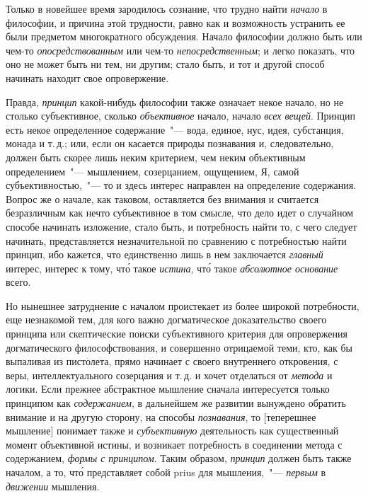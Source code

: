 Только в новейшее время зародилось сознание, что
трудно найти \emph{начало} в философии, и причина этой трудности,
равно как и возможность устранить ее были предметом
многократного обсуждения. Начало философии
должно быть или чем-то \emph{опосредствованным} или чем-то
\emph{непосредственным}; и легко показать, что оно не может
быть ни тем, ни другим; стало быть, и тот и другой способ
начинать находит свое опровержение.

Правда, \emph{принцип} какой-нибудь философии также
означает некое начало, но не столько субъективное,
сколько \emph{объективное} начало, начало \emph{всех вещей}. Принцип
есть некое определенное содержание~"--- вода, единое,
нус, идея, субстанция, монада\endnotemark{} и т.\,д.; или, если он касается
природы познавания и, следовательно, должен
быть скорее лишь неким критерием, чем неким объективным
определением~"--- мышлением, созерцанием, ощущением,
Я, самой субъективностью,~"--- то и здесь интерес
направлен на определение содержания. Вопрос же о начале,
как таковом, оставляется без внимания и считается
безразличным как нечто субъективное в том смысле, что
дело идет о случайном способе начинать изложение, стало
быть, и потребность найти то, с чего следует начинать,
представляется незначительной по сравнению с потребностью
найти принцип, ибо кажется, что единственно
лишь в нем заключается \emph{главный} интерес, интерес
к тому, чт\'о такое \emph{истина}, чт\'о такое \emph{абсолютное основание}
всего.


Но нынешнее затруднение с началом проистекает из
более широкой потребности, еще незнакомой тем, для
кого важно догматическое доказательство своего принципа
или скептические поиски субъективного критерия
для опровержения догматического философствования, и
совершенно отрицаемой теми, кто, как бы выпаливая из
пистолета\endnotemark{}, прямо начинает с своего внутреннего откровения,
с веры, интеллектуального созерцания и т.\,д. и
хочет отделаться от \emph{метода} и логики. Если прежнее абстрактное
мышление сначала интересуется только принципом
как \emph{содержанием}, в дальнейшем же развитии вынуждено
обратить внимание и на другую сторону, на способы
\emph{познавания}, то [теперешнее мышление] понимает
также и \emph{субъективную} деятельность как существенный
момент объективной истины, и возникает потребность в
соединении метода с содержанием, \emph{формы с принципом}.
Таким образом, \emph{принцип} должен быть также началом,
а то, чт\'о представляет собой prius для мышления,~"--- \emph{первым}
в \emph{движении} мышления.

